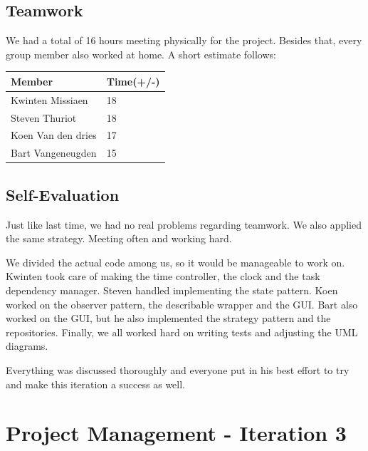 		\subsection{Teamwork}
		
		
		We had a total of 16 hours meeting physically for the project. Besides that, every group member also worked at home. A short estimate follows:\\
		 \begin{tabular}{l|l}
		Member & Time(+/-)\\ \hline
		Kwinten Missiaen & 18\\
		Steven Thuriot & 18\\
		Koen Van den dries & 17\\
		Bart Vangeneugden & 15\\
		\end{tabular}
		\subsection{Self-Evaluation}
		Just like last time, we had no real problems regarding teamwork. We also applied the same strategy. Meeting often and working hard.
	
		We divided the actual code among us, so it would be manageable to work on. Kwinten took care of making the time controller, the clock and the task dependency manager. Steven handled implementing the state pattern. Koen worked on the observer pattern, the describable wrapper and the GUI. Bart also worked on the GUI, but he also implemented the strategy pattern and the repositories. Finally, we all worked hard on writing tests and adjusting the UML diagrams.
	
		Everything was discussed thoroughly and everyone put in his best effort to try and make this iteration a success as well.
		
		\section{Project Management - Iteration 3}
